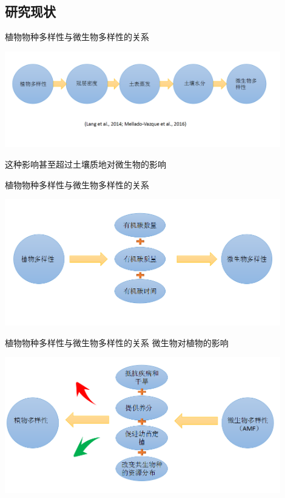 \subsection{研究现状}
\begin{frame}{\insertsection}{\insertsubsection}
	植物物种多样性与微生物多样性的关系
	\begin{center}
		\includegraphics[width = 0.9\textwidth]{./pic/1.2.1.png}
	\end{center}
	这种影响甚至超过土壤质地对微生物的影响
\end{frame}
\begin{frame}{\insertsection}{\insertsubsection}
	植物物种多样性与微生物多样性的关系
	\begin{center}
		\includegraphics[width = 0.9\textwidth]{./pic/1.2.2.png}
	\end{center}
\end{frame}
\begin{frame}{\insertsection}{\insertsubsection}
	植物物种多样性与微生物多样性的关系
	微生物对植物的影响
		\begin{center}
			\includegraphics[width = 0.9\textwidth]{./pic/1.2.3.png}
		\end{center}
\end{frame}
